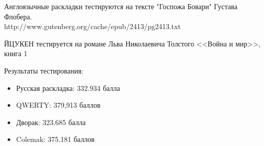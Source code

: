 \documentclass[14pt]{article} %
\begin{document}
Англоязычные раскладки тестируются на тексте "Госпожа Бовари" Густава Флобера.\\
http://www.gutenberg.org/cache/epub/2413/pg2413.txt

ЙЦУКЕН тестируется на романе Льва Николаевича Толстого <<Война и мир>>, книга 1

Результаты тестирования: 
\begin{itemize}
\item
Русская раскладка: 332.934 балла
\item
QWERTY: 379,913 баллов
\item
Дворак: 323.685 балла
\item
Colemak: 375.181 баллов\end{itemize}
\clearpage
{}
\end{document}
